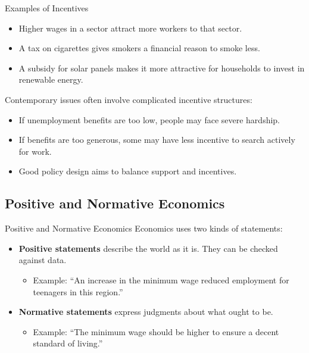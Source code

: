 \documentclass[aspectratio=169]{beamer}
\begin{document}
\begin{frame}{Examples of Incentives}
  \transfade
  \begin{itemize}[<+->]
    \item Higher wages in a sector attract more workers to that sector.
    \item A tax on cigarettes gives smokers a financial reason to smoke less.
    \item A subsidy for solar panels makes it more attractive for households to invest in renewable
    energy.
  \end{itemize}

  \vspace{0.3cm}
  Contemporary issues often involve complicated incentive structures:
  \begin{itemize}[<+->]
    \item If unemployment benefits are too low, people may face severe hardship.
    \item If benefits are too generous, some may have less incentive to search actively for work.
    \item Good policy design aims to balance support and incentives.
  \end{itemize}
\end{frame}

\subsection{Positive and Normative Economics}

\begin{frame}{Positive and Normative Economics}
  \transfade
  Economics uses two kinds of statements:

  \vspace{0.2cm}
  \begin{itemize}[<+->]
    \item \textbf{Positive statements} describe the world as it is. They can be checked against data.
          \begin{itemize}[<+->]
            \item Example: ``An increase in the minimum wage reduced employment for teenagers in
            this region.''
          \end{itemize}
    \item \textbf{Normative statements} express judgments about what ought to be.
          \begin{itemize}[<+->]
            \item Example: ``The minimum wage should be higher to ensure a decent standard of living.''
          \end{itemize}
  \end{itemize}
\end{frame}
\end{document}
